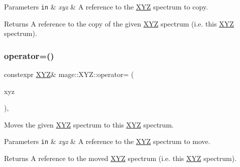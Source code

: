\begin{DoxyParams}[1]{Parameters}
\mbox{\tt in}  & {\em xyz} & A reference to the \hyperlink{structmage_1_1_x_y_z}{X\+YZ} spectrum to copy. \\
\hline
\end{DoxyParams}
\begin{DoxyReturn}{Returns}
A reference to the copy of the given \hyperlink{structmage_1_1_x_y_z}{X\+YZ} spectrum (i.\+e. this \hyperlink{structmage_1_1_x_y_z}{X\+YZ} spectrum). 
\end{DoxyReturn}
\hypertarget{structmage_1_1_x_y_z_ab162a3b19bdbb5abd84ad77052ac6030}{}\label{structmage_1_1_x_y_z_ab162a3b19bdbb5abd84ad77052ac6030} 
\subsubsection{\texorpdfstring{operator=()}{operator=()}\hspace{0.1cm}{\footnotesize\ttfamily [2/2]}}
{\footnotesize\ttfamily constexpr \hyperlink{structmage_1_1_x_y_z}{X\+YZ}\& mage\+::\+X\+Y\+Z\+::operator= (\begin{DoxyParamCaption}\item[{\hyperlink{structmage_1_1_x_y_z}{X\+YZ} \&\&}]{xyz }\end{DoxyParamCaption})\hspace{0.3cm}{\ttfamily [default]}, {\ttfamily [noexcept]}}

Moves the given \hyperlink{structmage_1_1_x_y_z}{X\+YZ} spectrum to this \hyperlink{structmage_1_1_x_y_z}{X\+YZ} spectrum.


\begin{DoxyParams}[1]{Parameters}
\mbox{\tt in}  & {\em xyz} & A reference to the \hyperlink{structmage_1_1_x_y_z}{X\+YZ} spectrum to move. \\
\hline
\end{DoxyParams}
\begin{DoxyReturn}{Returns}
A reference to the moved \hyperlink{structmage_1_1_x_y_z}{X\+YZ} spectrum (i.\+e. this \hyperlink{structmage_1_1_x_y_z}{X\+YZ} spectrum). 
\end{DoxyReturn}
